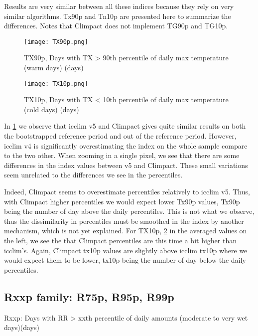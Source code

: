 \documentclass[a4paper,11pt]{article}
\begin{document}
            Results are very similar between all these indices because they rely on very similar algorithms. 
            Tx90p and Tn10p are presented here to summarize the differences.
            Notes that Climpact does not implement TG90p and TG10p.

            \begin{figure}[h]
                \centering
                \texttt{[image: TX90p.png]}
                \caption{TX90p, Days with TX > 90th percentile of daily max temperature (warm days) (days)}
                \label{figure/tx90p}
            \end{figure}

            \begin{figure}[h]
                \centering
                \texttt{[image: TX10p.png]}
                \caption{TX10p, Days with TX < 10th percentile of daily max temperature (cold days) (days)}
                \label{figure/tx10p}
            \end{figure}

            In \ref{figure/tx90p} we observe that icclim v5 and Climpact gives quite similar results on both the bootstrapped reference period and out of the reference period.
            However, icclim v4 is significantly overestimating the index on the whole sample compare to the two other.
            When zooming in a single pixel, we see that there are some differences in the index values between v5 and Climpact.
            These small variations seem unrelated to the differences we see in the percentiles.

            Indeed, Climpact seems to overestimate percentiles relatively to icclim v5. Thus, with Climpact higher percentiles we would expect lower Tx90p values, Tx90p being the number of day above the daily percentiles.
            This is not what we observe, thus the dissimilarity in percentiles must be smoothed in the index by another mechanism, which is not yet explained.
            For TX10p, \ref{figure/tx10p} in the averaged values on the left, we see the that Climpact percentiles are this time a bit higher than icclim's.
            Again, Climpact tx10p values are slightly above icclim tx10p where we would expect them to be lower, tx10p being the number of day below the daily percentiles.

        \subsection{Rxxp family: R75p, R95p, R99p}
            Rxxp: Days with RR > xxth percentile of daily amounts (moderate to very wet days)(days)
\end{document}
